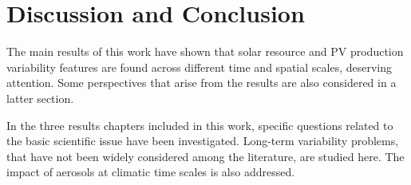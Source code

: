 


\chapter{Discussion and Conclusion\label{Conclusion}}

The main results of this work have shown that solar resource and PV production variability features are found across different time and spatial scales, deserving attention. Some perspectives that arise from the results are also considered in a latter section.
  
In the three results chapters included in this work, specific questions related to the basic scientific issue have been investigated. Long-term variability problems, that have not been widely considered among the literature, are studied here. The impact of aerosols at climatic time scales is also addressed. 



